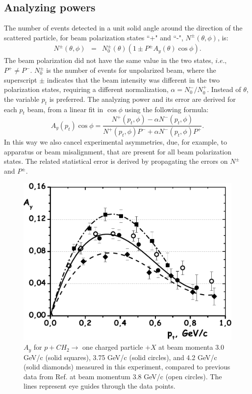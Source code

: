 \documentclass[twocolumn,epjc3]{svjour3}
\begin{document}
\subsection{Analyzing powers}
The number of events detected in a unit solid angle around the direction of the scattered particle, for beam polarization states ``+" and ``-", $N^{\pm}(\theta, \phi)$, is:
\begin{eqnarray}
  N^{\pm} (\theta, \phi)&=& N_{0}^{\pm}(\theta) (1\pm P^{\pm} A_{y}(\theta)\cos\phi).
\end{eqnarray}
The beam polarization did not have the same value in the two states, $i.e.,$ $P^{+} \neq P^{-} $.  $N_{0}^{\pm}$ is the number of events for unpolarized beam, where the superscript ${\pm}$ indicates that the beam intensity was different in the two polarization states, requiring a different normalization, $\alpha=N_{0}^-/N_{0}^+$.  Instead of $\theta$, the variable $p_t$ is preferred. The analyzing power and its error are derived for each $p_t$ beam, from a linear fit in $\cos\phi $ using the following formula:
\begin{equation}
  A_{y}(p_t) \cos\phi =\displaystyle\frac{N^+(p_t,\phi)- \alpha N^-(p_t,\phi)}
  {N^+(p_t,\phi)P^- + \alpha N^-(p_t,\phi) P^+}.
  \label{Eq:Asym}
\end{equation}
In this way we also cancel experimental asymmetries, due, for example, to apparatus or beam misalignment, that are present for all beam polarization states. The related statistical error is derived by propagating the errors on $N^\pm$ and $P^\pm$.

\begin{figure}
  \centering
  \includegraphics[width=1.00\columnwidth]{fig16_control_meas.pdf}
  \caption{$A_y$ for $p+CH_2\to$ one charged particle $+X$ at beam momenta 3.0 GeV/c (solid squares), 3.75 GeV/c (solid circles), and 4.2 GeV/c (solid diamonds) measured in this experiment, compared to previous data from Ref. \cite{Azhgirey:2004yk} at beam momentum 3.8 GeV/c (open circles). The lines represent eye guides through the data points.}
  \label{Fig:p+CH2_3-42}
\end{figure}
\end{document}
